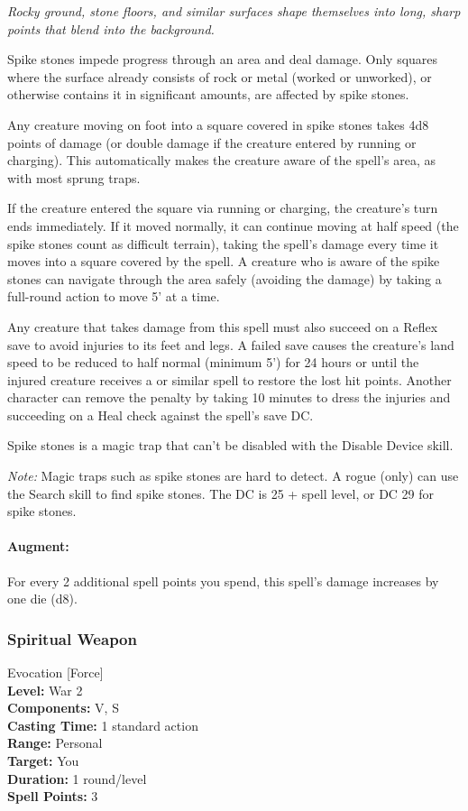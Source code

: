\emph{Rocky ground, stone floors, and similar surfaces shape themselves into long, sharp points that blend into the background.}

Spike stones impede progress through an area and deal damage. Only squares where the surface already consists of rock or metal (worked or unworked), or otherwise contains it in significant amounts, are affected by spike stones.

Any creature moving on foot into a square covered in spike stones takes 4d8 points of damage (or double damage if the creature entered by running or charging).
This automatically makes the creature aware of the spell's area, as with most sprung traps.

If the creature entered the square via running or charging, the creature's turn ends immediately.
If it moved normally, it can continue moving at half speed (the spike stones count as difficult terrain), taking the spell's damage every time it moves into a square covered by the spell. A creature who is aware of the spike stones can navigate through the area safely (avoiding the damage) by taking a full-round action to move 5' at a time.

Any creature that takes damage from this spell must also succeed on a Reflex save to avoid injuries to its feet and legs. 
A failed save causes the creature's land speed to be reduced to half normal (minimum 5') for 24 hours or until the injured creature receives a  or similar spell to restore the lost hit points. 
Another character can remove the penalty by taking 10 minutes to dress the injuries and succeeding on a Heal check against the spell's save DC.

Spike stones is a magic trap that can't be disabled with the Disable Device skill.

\emph{Note:} Magic traps such as spike stones are hard to detect. A rogue (only) can use the Search skill to find spike stones. The DC is 25 + spell level, or DC 29 for spike stones.

\paragraph{Augment:} For every 2 additional spell points you spend, this spell's damage increases by one die (d8).
\subsubsection{Spiritual Weapon}
\label{Spell:SpiritualWeapon}
Evocation [Force]
\\ \textbf{Level:} War 2
\\ \textbf{Components:} V, S
\\ \textbf{Casting Time:} 1 standard action
\\ \textbf{Range:} Personal
\\ \textbf{Target:} You
\\ \textbf{Duration:} 1 round/level
\\ \textbf{Spell Points:} 3


